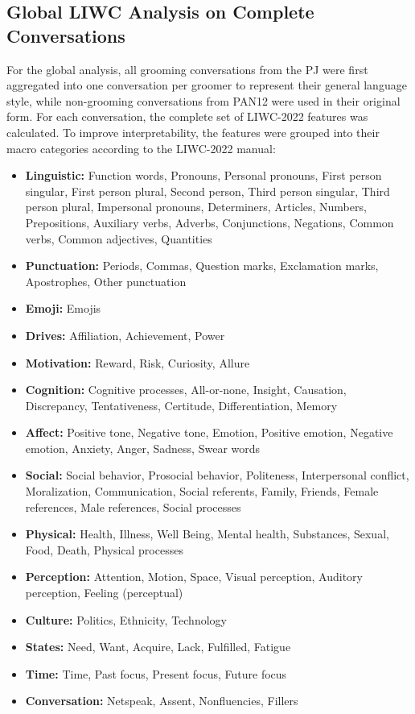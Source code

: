 
\subsection{Global LIWC Analysis on Complete Conversations}

For the global analysis, all grooming conversations from the PJ were first aggregated into one conversation per groomer to represent their general language style, while non-grooming conversations from PAN12 were used in their original form. 
For each conversation, the complete set of LIWC-2022 features was calculated.  
To improve interpretability, the features were grouped into their macro categories according to the LIWC-2022 manual:

\begin{itemize}
    \item \textbf{Linguistic:} Function words, Pronouns, Personal pronouns, First person singular, First person plural, Second person, Third person singular, Third person plural, Impersonal pronouns, Determiners, Articles, Numbers, Prepositions, Auxiliary verbs, Adverbs, Conjunctions, Negations, Common verbs, Common adjectives, Quantities
    \item \textbf{Punctuation:} Periods, Commas, Question marks, Exclamation marks, Apostrophes, Other punctuation
    \item \textbf{Emoji:} Emojis
    \item \textbf{Drives:} Affiliation, Achievement, Power
    \item \textbf{Motivation:} Reward, Risk, Curiosity, Allure
    \item \textbf{Cognition:} Cognitive processes, All-or-none, Insight, Causation, Discrepancy, Tentativeness, Certitude, Differentiation, Memory
    \item \textbf{Affect:} Positive tone, Negative tone, Emotion, Positive emotion, Negative emotion, Anxiety, Anger, Sadness, Swear words
    \item \textbf{Social:} Social behavior, Prosocial behavior, Politeness, Interpersonal conflict, Moralization, Communication, Social referents, Family, Friends, Female references, Male references, Social processes
    \item \textbf{Physical:} Health, Illness, Well Being, Mental health, Substances, Sexual, Food, Death, Physical processes
    \item \textbf{Perception:} Attention, Motion, Space, Visual perception, Auditory perception, Feeling (perceptual)
    \item \textbf{Culture:} Politics, Ethnicity, Technology
    \item \textbf{States:} Need, Want, Acquire, Lack, Fulfilled, Fatigue
    \item \textbf{Time:} Time, Past focus, Present focus, Future focus
    \item \textbf{Conversation:} Netspeak, Assent, Nonfluencies, Fillers
\end{itemize}


